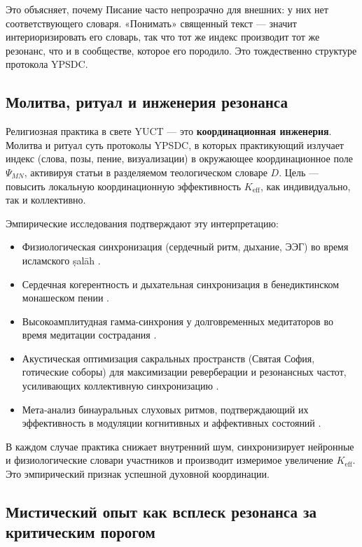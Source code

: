 \documentclass[12pt,a4paper]{article}
\begin{document}
	Это объясняет, почему Писание часто непрозрачно для внешних: у них нет соответствующего словаря. «Понимать» священный текст — значит интериоризировать его словарь, так что тот же индекс производит тот же резонанс, что и в сообществе, которое его породило. Это тождественно структуре протокола YPSDC.
	
	\subsection{Молитва, ритуал и инженерия резонанса}
	
	Религиозная практика в свете YUCT — это \textbf{координационная инженерия}. Молитва и ритуал суть протоколы YPSDC, в которых практикующий излучает индекс (слова, позы, пение, визуализации) в окружающее координационное поле \(\Psi_{MN}\), активируя статьи в разделяемом теологическом словаре \(D\). Цель — повысить локальную координационную эффективность \(K_{\mathrm{eff}}\), как индивидуально, так и коллективно.
	
	Эмпирические исследования подтверждают эту интерпретацию:
	\begin{itemize}[leftmargin=*]
		\item Физиологическая синхронизация (сердечный ритм, дыхание, ЭЭГ) во время исламского ṣalāh \cite{RoyalSociety2024}.
		\item Сердечная когерентность и дыхательная синхронизация в бенедиктинском монашеском пении \cite{Craswell2023}.
		\item Высокоамплитудная гамма-синхрония у долговременных медитаторов во время медитации сострадания \cite{Lutz2017}.
		\item Акустическая оптимизация сакральных пространств (Святая София, готические соборы) для максимизации реверберации и резонансных частот, усиливающих коллективную синхронизацию \cite{Pentcheva2020}.
		\item Мета‑анализ бинауральных слуховых ритмов, подтверждающий их эффективность в модуляции когнитивных и аффективных состояний \cite{Garcia2021}.
	\end{itemize}
	
	В каждом случае практика снижает внутренний шум, синхронизирует нейронные и физиологические словари участников и производит измеримое увеличение \(K_{\mathrm{eff}}\). Это эмпирический признак успешной духовной координации.
	
	\subsection{Мистический опыт как всплеск резонанса за критическим порогом}
	
\end{document}
